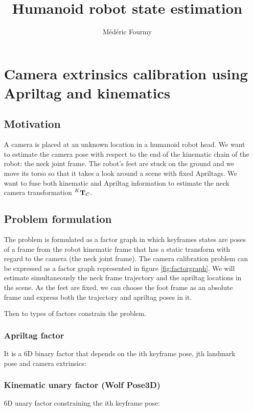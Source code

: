 \documentclass[11pt]{article}
\newcommand{\T}[2]{\prescript{#1}{}{\bfT}_{#2}}
\begin{document}
\author{Médéric Fourmy}
\title{Humanoid robot state estimation}
\maketitle

\section{Camera extrinsics calibration using Apriltag and kinematics}
\subsection{Motivation}
A camera is placed at an unknown location in a humanoid robot head. We want to estimate the camera pose with respect to the end of the kinematic chain of the robot: the neck joint frame.
The robot's feet are stuck on the ground and we move its torso so that it takes a look around a scene with fixed Apriltags. We want to fuse both kinematic and Apriltag information to estimate the neck camera transformation $\T{K}{C}$.

\subsection{Problem formulation}
The problem is formulated as a factor graph in which keyframes states are poses of a frame from the robot kinematic frame that has a static transform with regard to the camera (the neck joint frame). The camera calibration problem can be expressed as a factor graph represented in figure \ref{fig:factorgraph}. We will estimate simultaneously the neck frame trajectory and the apriltag locations in the scene. As the feet are fixed, we can choose the foot frame as an absolute frame and express both the trajectory and apriltag poses in it.

Then to types of factors constrain the problem.

\subsubsection*{Apriltag factor}
It is a 6D binary factor that depends on the ith keyframe pose, jth landmark pose and camera extrinsics:



\subsubsection*{Kinematic unary factor (Wolf Pose3D)}
6D unary factor constraining the ith keyframe pose:
\end{document}
